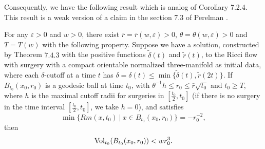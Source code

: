 Consequently, we have the following result which is analog of
Corollary 7.2.4. This result is a weak version of a claim in the
section 7.3 of {Perelman \cite{P2}}.

\begin{corollary}
  \label{cor:cz-large-time-local-volume-canonical-neighborhoods}

For any $\varepsilon > 0$ and $w>0$, there exist
$\bar{r}=\bar{r}(w,\varepsilon)>0$,
$\theta=\theta(w,\varepsilon)>0$ and $T=T(w)$ with the following
property. Suppose we have a solution, constructed by Theorem
$7.4.3$ with the positive functions $\widetilde{\delta}(t)$ and
$\widetilde{r}(t)$, to the Ricci flow with surgery with a compact
orientable normalized three-manifold as initial data, where each
$\delta$-cutoff at a time $t$ has $\delta=\delta(t)\leq
\min\{\widetilde{\delta}(t), \widetilde{r}(2t)\}$. If
$B_{t_0}(x_0,r_0)$ is a geodesic ball at time $t_0$, with
$\theta^{-1}h\leq r_0\leq \bar{r}\sqrt{t_0}$ and $t_0 \geq T$,
where $h$ is the maximal cutoff radii for surgeries in
$[\frac{t_0}{2},t_0]$ (if there is no surgery in the time interval
$[\frac{t_0}{2},t_0]$, we take $h=0$), and satisfies
$$
\min\{Rm(x,t_0)\ |\ x\in B_{t_0}(x_0,r_0)\}=-r^{-2}_0,
$$
then
$$
\operatorname{Vol}_{t_0}(B_{t_0}(x_0,r_0))<w r^3_0.
$$
\end{corollary}

